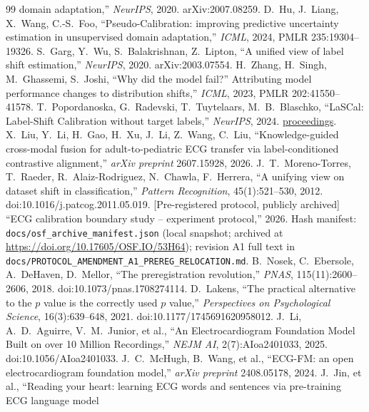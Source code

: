 \documentclass[final,5p,times,nonatbib]{elsarticle}
\begin{document}
\begin{thebibliography}{99}
domain adaptation,'' \emph{NeurIPS}, 2020. arXiv:2007.08259.
 D.~Hu, J.~Liang, X.~Wang, C.-S.~Foo,
``Pseudo-Calibration: improving predictive uncertainty estimation in
unsupervised domain adaptation,'' \emph{ICML}, 2024,
PMLR 235:19304--19326.
 S.~Garg, Y.~Wu, S.~Balakrishnan,
Z.~Lipton, ``A unified view of label shift estimation,''
\emph{NeurIPS}, 2020. arXiv:2003.07554.
 H.~Zhang, H.~Singh, M.~Ghassemi, S.~Joshi,
``Why did the model fail?'' Attributing model performance changes to
distribution shifts,'' \emph{ICML}, 2023, PMLR 202:41550--41578.
 T.~Popordanoska, G.~Radevski, T.~Tuytelaars,
M.~B.~Blaschko, ``LaSCal: Label-Shift Calibration without target
labels,'' \emph{NeurIPS}, 2024.
\href{https://proceedings.neurips.cc/paper_files/paper/2024/hash/783c5986e1d6112cb4688d9b2105609a-Abstract-Conference.html}{proceedings}.
 X.~Liu, Y.~Li, H.~Gao, H.~Xu, J.~Li, Z.~Wang,
C.~Liu, ``Knowledge-guided cross-modal fusion for adult-to-pediatric
ECG transfer via label-conditioned contrastive alignment,''
\emph{arXiv preprint} 2607.15928, 2026.
 J.~T.~Moreno-Torres, T.~Raeder,
R.~Alaiz-Rodriguez, N.~Chawla, F.~Herrera, ``A unifying view on
dataset shift in classification,'' \emph{Pattern Recognition},
45(1):521--530, 2012. doi:10.1016/j.patcog.2011.05.019.
 [Pre-registered protocol, publicly archived] ``ECG
calibration boundary study -- experiment protocol,'' 2026. Hash manifest:
\texttt{docs/osf\_archive\_manifest.json} (local snapshot; archived at
\url{https://doi.org/10.17605/OSF.IO/53H64}); revision A1 full text in
\texttt{docs/PROTOCOL\_AMENDMENT\_A1\_PREREG\_RELOCATION.md}.
 B.~Nosek, C.~Ebersole, A.~DeHaven,
D.~Mellor, ``The preregistration revolution,'' \emph{PNAS},
115(11):2600--2606, 2018. doi:10.1073/pnas.1708274114.
 D.~Lakens, ``The practical alternative to
the $p$ value is the correctly used $p$ value,''
\emph{Perspectives on Psychological Science}, 16(3):639--648, 2021.
doi:10.1177/1745691620958012.
 J.~Li, A.~D.~Aguirre, V.~M.~Junior, et al.,
``An Electrocardiogram Foundation Model Built on over 10 Million
Recordings,'' \emph{NEJM AI},
2(7):AIoa2401033, 2025. doi:10.1056/AIoa2401033.
 J.~C.~McHugh, B.~Wang, et al., ``ECG-FM: an open
electrocardiogram foundation model,'' \emph{arXiv preprint}
2408.05178, 2024.
 J.~Jin, et al., ``Reading your heart: learning
ECG words and sentences via pre-training ECG language model

\end{thebibliography}
\end{document}
